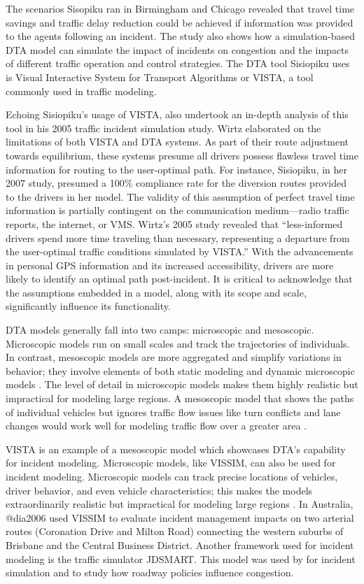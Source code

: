 \documentclass[
  letterpaper,
  authoryear]{elsarticle}
\begin{document}
The scenarios Sisopiku ran in Birmingham and Chicago revealed that
travel time savings and traffic delay reduction could be achieved if
information was provided to the agents following an incident. The study
also shows how a simulation-based DTA model can simulate the impact of
incidents on congestion and the impacts of different traffic operation
and control strategies. The DTA tool Sisiopiku uses is Visual
Interactive System for Transport Algorithms or VISTA, a tool commonly
used in traffic modeling.

Echoing Sisiopiku's usage of VISTA, \citet{wirtz2005} also undertook an
in-depth analysis of this tool in his 2005 traffic incident simulation
study. Wirtz elaborated on the limitations of both VISTA and DTA
systems. As part of their route adjustment towards equilibrium, these
systems presume all drivers possess flawless travel time information for
routing to the user-optimal path. For instance, Sisiopiku, in her 2007
study, presumed a 100\% compliance rate for the diversion routes
provided to the drivers in her model. The validity of this assumption of
perfect travel time information is partially contingent on the
communication medium---radio traffic reports, the internet, or VMS.
Wirtz's 2005 study revealed that ``less-informed drivers spend more time
traveling than necessary, representing a departure from the user-optimal
traffic conditions simulated by VISTA.'' With the advancements in
personal GPS information and its increased accessibility, drivers are
more likely to identify an optimal path post-incident. It is critical to
acknowledge that the assumptions embedded in a model, along with its
scope and scale, significantly influence its functionality.

DTA models generally fall into two camps: microscopic and mesoscopic.
Microscopic models run on small scales and track the trajectories of
individuals. In contrast, mesoscopic models are more aggregated and
simplify variations in behavior; they involve elements of both static
modeling and dynamic microscopic models \citep{boyles2018}. The level of
detail in microscopic models makes them highly realistic but impractical
for modeling large regions. A mesoscopic model that shows the paths of
individual vehicles but ignores traffic flow issues like turn conflicts
and lane changes would work well for modeling traffic flow over a
greater area \citep{boyles2018}.

VISTA is an example of a mesoscopic model which showcases DTA's
capability for incident modeling. Microscopic models, like VISSIM, can
also be used for incident modeling. Microscopic models can track precise
locations of vehicles, driver behavior, and even vehicle
characteristics; this makes the models extraordinarily realistic but
impractical for modeling large regions \citep{boyles2018}. In Australia,
@dia2006 used VISSIM to evaluate incident management impacts on two
arterial routes (Coronation Drive and Milton Road) connecting the
western suburbs of Brisbane and the Central Business District. Another
framework used for incident modeling is the traffic simulator JDSMART.
This model was used by \citet{vanlint2012} for incident simulation and
to study how roadway policies influence congestion.
\end{document}
